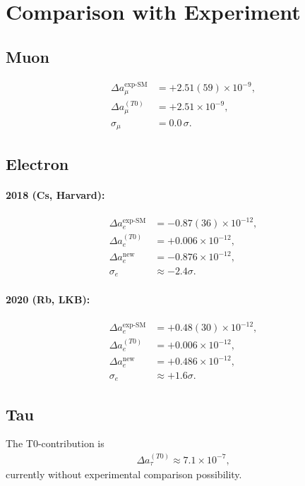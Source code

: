 \documentclass[12pt,a4paper]{article}
\theoremstyle{definition}
\begin{document}
	\section{Comparison with Experiment}
	
	\subsection*{Muon}
	\begin{align}
		\Delta a_\mu^{\text{exp-SM}} &= +2.51(59) \times 10^{-9}, \\
		\Delta a_\mu^{(T0)} &= +2.51 \times 10^{-9}, \\
		\sigma_\mu &= 0.0 \,\sigma.
	\end{align}
	
	\subsection*{Electron}
	\paragraph{2018 (Cs, Harvard):}
	\begin{align}
		\Delta a_e^{\text{exp-SM}} &= -0.87(36) \times 10^{-12}, \\
		\Delta a_e^{(T0)} &= +0.006 \times 10^{-12}, \\
		\Delta a_e^{\text{new}} &= -0.876 \times 10^{-12}, \\
		\sigma_e &\approx -2.4\sigma.
	\end{align}
	
	\paragraph{2020 (Rb, LKB):}
	\begin{align}
		\Delta a_e^{\text{exp-SM}} &= +0.48(30) \times 10^{-12}, \\
		\Delta a_e^{(T0)} &= +0.006 \times 10^{-12}, \\
		\Delta a_e^{\text{new}} &= +0.486 \times 10^{-12}, \\
		\sigma_e &\approx +1.6\sigma.
	\end{align}
	
	\subsection*{Tau}
	The T0-contribution is
	\begin{align}
		\Delta a_\tau^{(T0)} \approx 7.1 \times 10^{-7},
	\end{align}
	currently without experimental comparison possibility.
	
\end{document}
